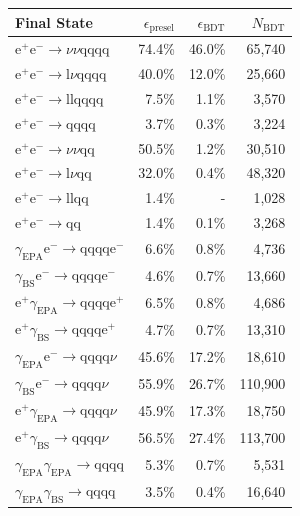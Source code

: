\begin{table}[h!]
\centering
\begin{tabular}{ l r r r }
\hline
Final State & $\epsilon_{\text{presel}}$ & $\epsilon_{\text{BDT}}$ & $N_{\text{BDT}}$ \\ 
\hline
$\text{e}^{+}\text{e}^{-} \rightarrow \nu{\nu}\text{qqqq}$ & 74.4\% & 46.0\% & 65,740 \\
$\text{e}^{+}\text{e}^{-} \rightarrow \text{l}\nu\text{qqqq}$ & 40.0\% & 12.0\% & 25,660 \\
$\text{e}^{+}\text{e}^{-} \rightarrow \text{llqqqq}$ & 7.5\% & 1.1\% & 3,570 \\
$\text{e}^{+}\text{e}^{-} \rightarrow \text{qqqq}$ & 3.7\% & 0.3\% & 3,224 \\
$\text{e}^{+}\text{e}^{-} \rightarrow \nu{\nu}\text{qq}$ & 50.5\% & 1.2\% & 30,510 \\
$\text{e}^{+}\text{e}^{-} \rightarrow \text{l}\nu\text{qq}$ & 32.0\% & 0.4\% & 48,320 \\
$\text{e}^{+}\text{e}^{-} \rightarrow \text{llqq}$ & 1.4\% & - & 1,028 \\
$\text{e}^{+}\text{e}^{-} \rightarrow \text{qq}$ & 1.4\% & 0.1\% & 3,268 \\
$\gamma_{\text{EPA}}\text{e}^{-} \rightarrow \text{qqqq}\text{e}^{-}$ & 6.6\% & 0.8\% & 4,736 \\
$\gamma_{\text{BS}}\text{e}^{-} \rightarrow \text{qqqq}\text{e}^{-}$ & 4.6\% & 0.7\% & 13,660 \\
$\text{e}^{+}\gamma_{\text{EPA}} \rightarrow \text{qqqq}\text{e}^{+}$ & 6.5\% & 0.8\% & 4,686 \\
$\text{e}^{+}\gamma_{\text{BS}} \rightarrow \text{qqqq}\text{e}^{+}$ & 4.7\% & 0.7\% & 13,310 \\
$\gamma_{\text{EPA}}\text{e}^{-} \rightarrow \text{qqqq}\nu$ & 45.6\% & 17.2\% & 18,610 \\
$\gamma_{\text{BS}}\text{e}^{-} \rightarrow \text{qqqq}\nu$ & 55.9\% & 26.7\% & 110,900 \\
$\text{e}^{+}\gamma_{\text{EPA}} \rightarrow \text{qqqq}\nu$ & 45.9\% & 17.3\% & 18,750 \\
$\text{e}^{+}\gamma_{\text{BS}} \rightarrow \text{qqqq}\nu$ & 56.5\% & 27.4\% & 113,700 \\
$\gamma_{\text{EPA}}\gamma_{\text{EPA}} \rightarrow \text{qqqq}$ & 5.3\% & 0.7\% & 5,531 \\
$\gamma_{\text{EPA}}\gamma_{\text{BS}} \rightarrow \text{qqqq}$ & 3.5\% & 0.4\% & 16,640 \\

\end{tabular}
\end{table}
